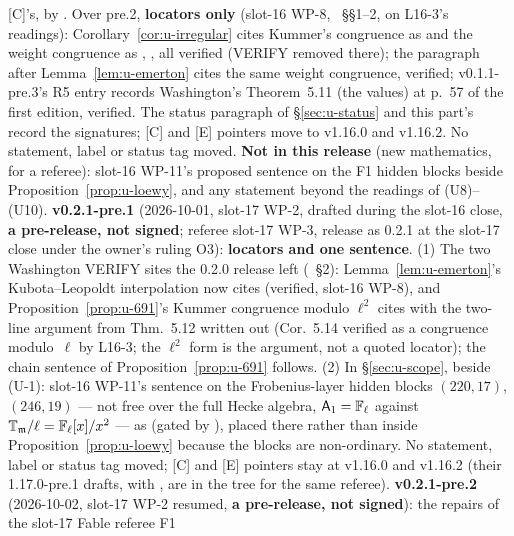 \documentclass[11pt]{article}
\newcommand{\VERIFYloc}{\textsf{VERIFY}}          %
\begin{document}
[C]'s, by . Over pre.2, \textbf{locators only} (slot-16 WP-8,
~\S\S1--2, on L16-3's readings): Corollary~\ref{cor:u-irregular} cites Kummer's congruence as
\cite[Cor.~5.14, p.~61]{washington1st} and the weight congruence as \cite[Thm.~2(iv), p.~22]{swinnerton_dyer}, \cite[n$^\circ$~1.2, Th.~2, p.~416-04]{serre_bourbaki416}, all
verified (\VERIFYloc{} removed there); the paragraph after Lemma~\ref{lem:u-emerton} cites the same weight congruence, verified; v0.1.1-pre.3's R5 entry
records Washington's Theorem~5.11 (the values) at p.~57 of the first edition, verified. The status paragraph of \S\ref{sec:u-status} and this part's record the
signatures; [C] and [E] pointers move to v1.16.0 and v1.16.2. No statement, label or status tag moved. \textbf{Not in this release} (new mathematics, for a referee):
slot-16 WP-11's proposed sentence on the F1 hidden blocks beside Proposition~\ref{prop:u-loewy}, and any statement beyond the readings of (U8)--(U10).
\textbf{v0.2.1-pre.1} (2026-10-01, slot-17 WP-2, drafted during the slot-16 close, \textbf{a pre-release, not signed}; referee slot-17 WP-3, release as 0.2.1 at
the slot-17 close under the owner's ruling O3): \textbf{locators and one \COMP{} sentence}. (1) The two Washington \VERIFYloc{} sites the 0.2.0 release left
(~\S2): Lemma~\ref{lem:u-emerton}'s Kubota--Leopoldt interpolation now cites
\cite[Thm.~5.11, p.~57]{washington1st} (verified, slot-16 WP-8), and Proposition~\ref{prop:u-691}'s Kummer congruence modulo $\ell^{2}$ cites
\cite[Thm.~5.11, Thm.~5.12, Cor.~5.14]{washington1st} with the two-line argument from Thm.~5.12 written out (Cor.~5.14 verified as a congruence modulo~$\ell$ by
L16-3; the $\ell^{2}$ form is the argument, not a quoted locator); the chain sentence of Proposition~\ref{prop:u-691} follows. (2) In \S\ref{sec:u-scope}, beside
(U-1): slot-16 WP-11's sentence on the Frobenius-layer hidden blocks $(220,17)$, $(246,19)$ --- not free over the full Hecke algebra, $\mathsf A_1=\mathbb{F}_\ell$ against
$\mathbb{T}_{\mathfrak m}/\ell=\mathbb{F}_\ell[x]/x^{2}$ --- as \COMP{} (gated by ), placed there rather than inside Proposition~\ref{prop:u-loewy} because
the blocks are non-ordinary. No statement, label or status tag moved; [C] and [E] pointers stay at v1.16.0 and v1.16.2 (their 1.17.0-pre.1 drafts, with
, are in the tree for the same referee).
\textbf{v0.2.1-pre.2} (2026-10-02, slot-17 WP-2 resumed, \textbf{a pre-release, not signed}): the repairs of the slot-17 Fable referee F1
\end{document}
